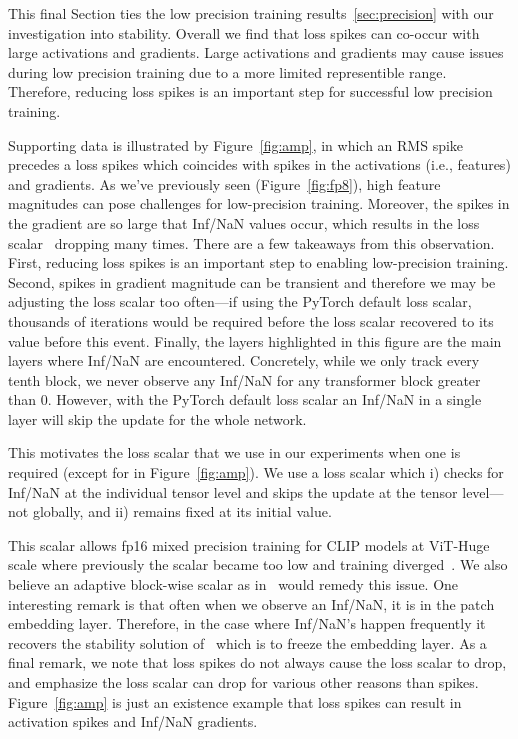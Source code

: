 This final Section ties the low precision training results~\ref{sec:precision} with our investigation into stability. Overall we find that loss spikes can co-occur with large activations and gradients. Large activations and gradients may cause issues during low precision training due to a more limited representible range. Therefore, reducing loss spikes is an important step for successful low precision training.

Supporting data is illustrated by Figure~\ref{fig:amp}, in which an RMS spike precedes a loss spikes which coincides with spikes in the activations (i.e., features) and gradients. As we've previously seen (Figure~\ref{fig:fp8}), high feature magnitudes can pose challenges for low-precision training. Moreover, the spikes in the gradient are so large that Inf/NaN values occur, which results in the loss scalar~\cite{micikevicius2022fp8} dropping many times. There are a few takeaways from this observation. First, reducing loss spikes is an important step to enabling low-precision training. Second, spikes in gradient magnitude can be transient and therefore we may be adjusting the loss scalar too often---if using the PyTorch default loss scalar, thousands of iterations would be required before the loss scalar recovered to its value before this event. Finally, the layers highlighted in this figure are the main layers where Inf/NaN are encountered. Concretely, while we only track every tenth block, we never observe any Inf/NaN for any transformer block greater than 0. However, with the PyTorch default loss scalar an Inf/NaN in a single layer will skip the update for the whole network.

This motivates the loss scalar that we use in our experiments when one is required (except for in Figure~\ref{fig:amp}).
We use a loss scalar which i) checks for Inf/NaN at the individual tensor level and skips the update at the tensor level---not globally, and ii) remains fixed at its initial value.

This scalar allows fp16 mixed precision training for CLIP models at ViT-Huge scale where previously the scalar became too low and training diverged~\cite{cherti2022reproducible}. We also believe an adaptive block-wise scalar as in~\citet{ramesh2021zero} would remedy this issue. One interesting remark is that often when we observe an Inf/NaN, it is in the patch embedding layer. Therefore, in the case where Inf/NaN's happen frequently it recovers the stability solution of~\citet{chen2021empirical} which is to freeze the embedding layer. As a final remark, we note that loss spikes do not always cause the loss scalar to drop, and emphasize the loss scalar can drop for various other reasons than spikes.
Figure~\ref{fig:amp} is just an existence example that loss spikes can result in activation spikes and Inf/NaN gradients.


